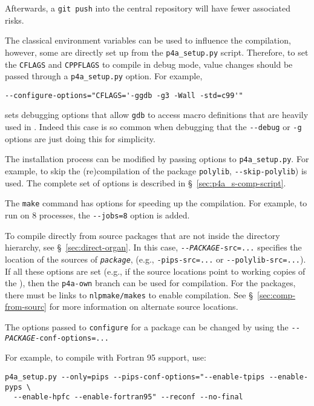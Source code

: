 \documentclass[a4paper]{article}
\begin{document}
Afterwards, a \texttt{git push} into the central \Apfa
repository will have fewer associated risks.

The classical \Aautotools environment variables can be used to influence
the compilation, however, some are directly set up from the \verb|p4a_setup.py|
script. Therefore, to set the \texttt{CFLAGS} and \texttt{CPPFLAGS}
to compile \Apfa in debug mode, value changes should be passed through
a \verb|p4a_setup.py| option. For example,
\begin{verbatim}
--configure-options="CFLAGS='-ggdb -g3 -Wall -std=c99'"
\end{verbatim}
sets debugging options that allow \texttt{gdb} to access macro
definitions that are heavily used in \Apips. Indeed this case is so common
when debugging \Apfa that the \verb|--debug| or \verb|-g| options are just
doing this for simplicity.

The installation process can be modified by passing options to
\verb|p4a_setup.py|. For example, to skip the (re)compilation of the
package \texttt{polylib},
\verb/--skip-polylib/) is used. The complete set of options is described in
\S~\ref{sec:p4a_s-comp-script}.

The \texttt{make} command has options for speeding up the compilation. For
example, to run on 8 processes, the \verb/--jobs=8/ option is added.

To compile \Apfa directly from source packages that are not
inside the \Apfa directory hierarchy, see \S~\ref{sec:direct-organ}. In
this case, \texttt{-{}-\emph{PACKAGE}-src=...} specifies the
location of the sources of \texttt{\emph{package}}, (e.g.,
\verb|-pips-src=...| or \verb|--polylib-src=...|). If all these options are
set (e.g., if the source locations point to working copies of the
\Apips{} \Asvn), then the \texttt{p4a-own} branch can be used for
compilation. For the \Apips
packages, there must be links to \texttt{nlpmake/makes} to enable compilation.
See \S~\ref{sec:comp-from-sourc} for more information on alternate
source locations.

The options passed to \texttt{configure} for a package can be changed by
using the \texttt{-{}-\emph{PACKAGE}-conf-options=...}

For example, to compile \Apips with Fortran 95 support, use:
\begin{verbatim}
p4a_setup.py --only=pips --pips-conf-options="--enable-tpips --enable-pyps \
  --enable-hpfc --enable-fortran95" --reconf --no-final
\end{verbatim}
\end{document}
